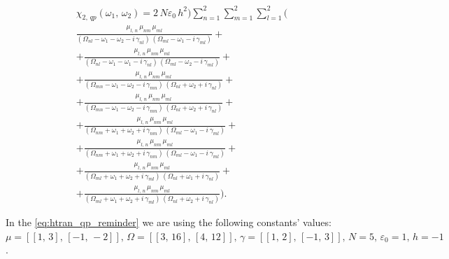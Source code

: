 \documentclass[12pt,twoside,a4paper]{article}
\numberwithin{equation}{subsection}
\numberwithin{figure}{subsection}
\begin{document}
\begin{multline} \label{eq:htran_qp_reminder}
  {\chi_{2, \,qp}}({\omega_{1}}, \,{\omega_{2}}) = 
  2 \, N { \varepsilon_{0}}\,h^{2}) \sum_{n=1}^{2} \sum_{m=1}^{2} \sum_{l=1}^{2} 
  (\\ \frac {{\mu_{l, \,n}}\,{\mu_{nm}}\,{\mu_{ml}}}
      {({\Omega_{nl}} - \omega_1 - \omega_2 - i\,{\gamma_{nl}})\,({\Omega_{ml}} - \omega_1 - i\,{\gamma_{ml}})}
  +\\ + \frac {{\mu_{l, \,n}}\,{\mu_{nm}}\,{\mu_{ml}}}
      {({\Omega_{nl}} - \omega_1 - \omega_1 - i\,{\gamma_{nl}})\,({\Omega_{ml}} - \omega_2 - i\,{\gamma_{ml}})} 
  +\\ + \frac {{\mu_{l, \,n}}\,{\mu_{nm}} \,{\mu_{ml}}}
      {({\Omega_{mn}} - \omega_1 - \omega_2 - i\,{\gamma_{mn}})\,({\Omega_{nl}} + \omega_2 + i\,{\gamma_{nl}})} 
  +\\ + \frac {{\mu_{l, \,n}}\,{\mu_{nm}}\,{\mu_{ml}}}
      {({\Omega_{mn}} - \omega_1 - \omega_2 - i\,{\gamma_{mn}})\,({\Omega_{nl}} + \omega_2 + i\,{\gamma_{nl}})} 
  +\\ + \frac {{\mu_{l, \,n}}\,{\mu_{nm}}\,{\mu_{ml}}}
      {({\Omega_{nm}} + \omega_1 + \omega_2 + i\,{\gamma_{nm}})\,({\Omega_{ml}} - \omega_1 - i\,{\gamma_{ml}})} 
  +\\ + \frac {{\mu_{l, \,n}}\,{\mu_{nm}}\,{\mu_{ml}}}
      {({\Omega_{nm}} + \omega_1 + \omega_2 + i\,{\gamma_{nm}})\,({\Omega_{ml}} - \omega_1 - i\,{\gamma_{ml}})} 
  +\\ + \frac {{\mu_{l, \,n}}\,{\mu_{nm}}\,{\mu_{ml}}}
      {({\Omega_{ml}} + \omega_1 + \omega_2 + i\,{\gamma_{ml}})\,({\Omega_{nl}} + \omega_1 + i\,{\gamma_{nl}})} 
  +\\ + \frac {{\mu_{l, \,n}}\,{\mu_{nm}}\,{\mu_{ml}}}
      {({\Omega_{ml}} + \omega_1 + \omega_2 + i\,{\gamma_{ml}})\,({\Omega_{nl}} + \omega_2 + i\,{\gamma_{nl}})}
  ) .
\end{multline} 

In the \ref{eq:htran_qp_reminder} we are using the following constants' values:
$\mu=[[1,\,3],\,[-1,\,-2]],\,\Omega=[[3,\,16],\,[4,\,12]],\,\gamma=[[1,\,2],\,[-1,\,3]],\,N=5,\,\varepsilon_{0}=1,\,h=-1$.

 
\end{document}
